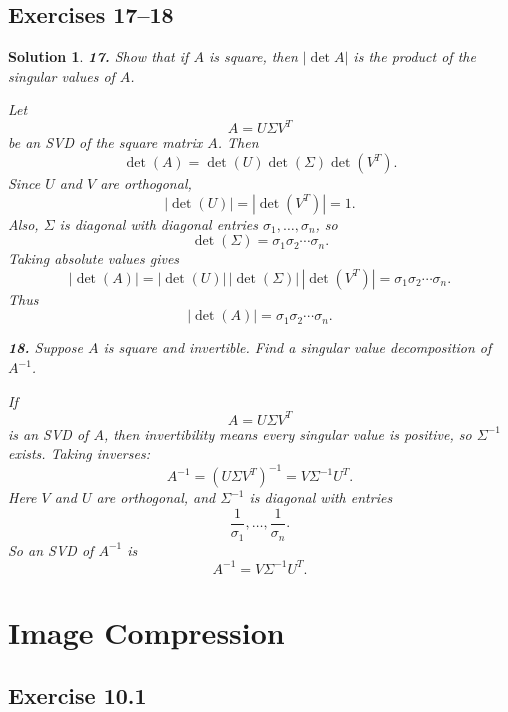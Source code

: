 \documentclass[11pt,a4paper]{article}
\theoremstyle{sol}
\newtheorem*{solution}{Solution}
\begin{document}
\clearpage
\subsection*{Exercises 17--18}

\begin{solution}
\textbf{17.} \emph{Show that if $A$ is square, then $|\det A|$ is the product of the singular values of $A$.}

Let
\[
A=U\Sigma V^T
\]
be an SVD of the square matrix $A$. Then
\[
\det(A)=\det(U)\det(\Sigma)\det(V^T).
\]
Since $U$ and $V$ are orthogonal,
\[
|\det(U)|=|\det(V^T)|=1.
\]
Also, $\Sigma$ is diagonal with diagonal entries $\sigma_1,\dots,\sigma_n$, so
\[
\det(\Sigma)=\sigma_1\sigma_2\cdots\sigma_n.
\]
Taking absolute values gives
\[
|\det(A)|=|\det(U)|\,|\det(\Sigma)|\,|\det(V^T)|
=\sigma_1\sigma_2\cdots\sigma_n.
\]
Thus
\[
\boxed{|\det(A)|=\sigma_1\sigma_2\cdots\sigma_n.}
\]

\medskip
\textbf{18.} \emph{Suppose $A$ is square and invertible. Find a singular value decomposition of $A^{-1}$.}

If
\[
A=U\Sigma V^T
\]
is an SVD of $A$, then invertibility means every singular value is positive, so $\Sigma^{-1}$ exists. Taking inverses:
\[
A^{-1}=(U\Sigma V^T)^{-1}=V\Sigma^{-1}U^T.
\]
Here $V$ and $U$ are orthogonal, and $\Sigma^{-1}$ is diagonal with entries
\[
\frac{1}{\sigma_1},\dots,\frac{1}{\sigma_n}.
\]
So an SVD of $A^{-1}$ is
\[
\boxed{A^{-1}=V\Sigma^{-1}U^T.}
\]
\end{solution}

\clearpage
\section{Image Compression}

\subsection*{Exercise 10.1}
\end{document}
